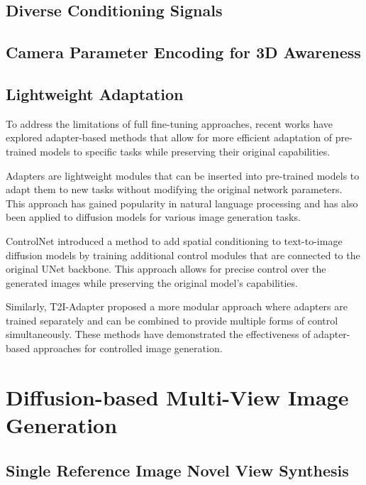 \subsection{Diverse Conditioning Signals}

\subsection{Camera Parameter Encoding for 3D Awareness}

\subsection{Lightweight Adaptation}

To address the limitations of full fine-tuning approaches, recent works have explored adapter-based methods that allow for more efficient adaptation of pre-trained models to specific tasks while preserving their original capabilities.

Adapters are lightweight modules that can be inserted into pre-trained models to adapt them to new tasks without modifying the original network parameters. This approach has gained popularity in natural language processing and has also been applied to diffusion models for various image generation tasks.

ControlNet \cite{controlnet} introduced a method to add spatial conditioning to text-to-image diffusion models by training additional control modules that are connected to the original UNet backbone. This approach allows for precise control over the generated images while preserving the original model's capabilities.

Similarly, T2I-Adapter \cite{t2iadapter} proposed a more modular approach where adapters are trained separately and can be combined to provide multiple forms of control simultaneously. These methods have demonstrated the effectiveness of adapter-based approaches for controlled image generation.

\section{Diffusion-based Multi-View Image Generation}\label{sec:multi-view-diffusion}

\subsection{Single Reference Image Novel View Synthesis}

